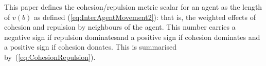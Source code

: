 \documentclass{ieeeaccess}
\begin{document}



This paper defines the cohesion/repulsion metric scalar for an agent as the length of $v(b)$  as defined (\ref{eq:InterAgentMovement2}): that is, the weighted effects of cohesion and repulsion by neighbours of the agent. This number carries a negative sign if repulsion dominatesand a positive sign if cohesion dominates and a positive sign if cohesion donates. This is summarised by~(\ref{eq:CohesionRepulsion}).
\end{document}
